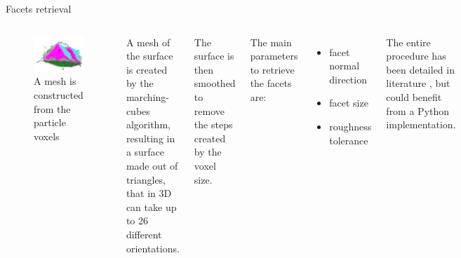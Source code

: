 \begin{frame}{Facets retrieval}
    \begin{columns}
        \begin{figure}
            \centering
            \includegraphics[width=\textwidth]{Figures/bcdi_data/facets_probability.png}
            \caption{A mesh is constructed from the particle voxels }
            \label{fig:particle_mesh}
        \end{figure}


        A mesh of the surface is created by the marching-cubes algorithm, resulting in a surface made out of triangles, that in 3D can take up to 26 different orientations. 
        
        The surface is then smoothed to remove the steps created by the voxel size. 

        The main parameters to retrieve the facets are:
        \begin{itemize}
            \item facet normal direction
            \item facet size
            \item roughness tolerance
        \end{itemize}

        The entire procedure has been detailed in literature \footnotemark{}, but could benefit from a Python implementation.



\end{columns}
\end{frame}
